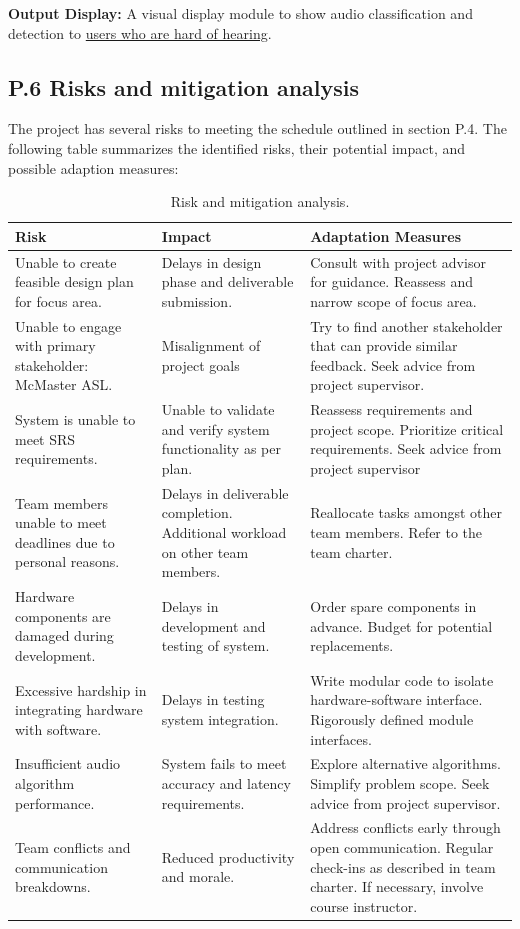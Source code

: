 \documentclass[12pt]{article}
\theoremstyle{definition}
\begin{document}
\textbf{Output Display:}
A visual display module to show audio classification and detection to
\hyperref[stakeholder:hardHearing]{users who are hard of hearing}.

\subsection{P.6 Risks and mitigation analysis}

The project has several risks to meeting the schedule outlined in section P.4.
The following table summarizes the identified risks, their potential impact,
and possible adaption measures:

\begin{table}[H]
\centering
\begin{tabular}{|p{4cm}|p{6cm}|p{6cm}|}
  \hline
  \textbf{Risk} & \textbf{Impact} & \textbf{Adaptation Measures} \\
  \hline
  Unable to create feasible design plan for focus area. & Delays in design phase 
  and deliverable submission. & Consult with project advisor for guidance. 
  Reassess and narrow scope of focus area. \\
  \hline
  Unable to engage with primary stakeholder: McMaster ASL. & Misalignment of project goals & 
  Try to find another stakeholder that can provide similar feedback. Seek advice
  from project supervisor. \\
  \hline
  System is unable to meet SRS requirements. & Unable to validate and verify system
  functionality as per plan. & Reassess requirements and project scope. Prioritize
  critical requirements. Seek advice from project supervisor\\
  \hline
  Team members unable to meet deadlines due to personal reasons. & Delays in deliverable
  completion. Additional workload on other team members. & Reallocate tasks amongst
  other team members. Refer to the team charter. \\
  \hline
  Hardware components are damaged during development. & Delays in development and testing
  of system. & Order spare components in advance. Budget for potential replacements. \\
  \hline
  Excessive hardship in integrating hardware with software. & Delays in testing 
  system integration. & Write modular code to isolate hardware-software interface.
  Rigorously defined module interfaces.\\
  \hline
  Insufficient audio algorithm performance. & System fails to meet accuracy and latency
  requirements. & Explore alternative algorithms. Simplify problem scope. Seek advice
  from project supervisor. \\
  \hline
  Team conflicts and communication breakdowns. & Reduced productivity and morale. &
  Address conflicts early through open communication. Regular check-ins as described 
  in team charter. If necessary, involve course instructor. \\
  \hline


\end{tabular}
\caption{Risk and mitigation analysis.}
\label{tab:risk-mitigation}
\end{table}
\end{document}
